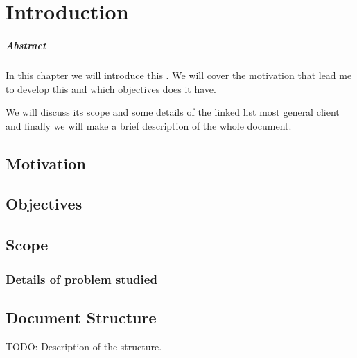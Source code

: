\chapter{Introduction\label{chap:introduction}}

\paragraph{Abstract}

In this chapter we will introduce this \thisworkm. We will cover the motivation that lead me to develop this \thisworkm and which objectives does it have.

We will discuss its scope and some details of the linked list most general client and finally we will make a brief description of the whole document. 

\section{Motivation}
\section{Objectives}

\section{Scope}

\subsection{Details of problem studied}

\label{def:leap}

\section{Document Structure}

TODO: Description of the structure.
